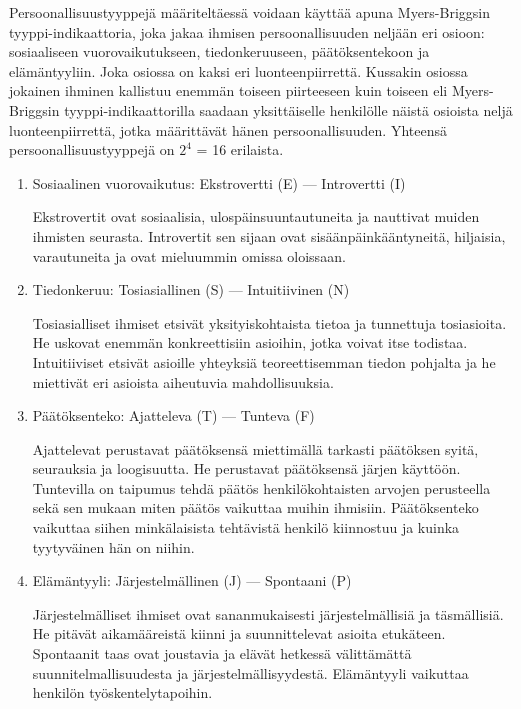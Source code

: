 \documentclass[finnish]{../tktltiki2}
\theoremstyle{definition}
\theoremstyle{remark}
\begin{document}
Persoonallisuustyyppejä määriteltäessä voidaan käyttää apuna
Myers-Briggsin tyyppi-indikaattoria, joka jakaa ihmisen persoonallisuuden neljään eri osioon: sosiaaliseen vuorovaikutukseen, tiedonkeruuseen, päätöksentekoon ja elämän\-tyyliin. Joka osiossa on
kaksi eri luonteenpiirrettä. Kussakin osiossa jokainen ihminen kallistuu enemmän toiseen piirteeseen kuin toiseen eli Myers-Briggsin
tyyppi-indikaattorilla saadaan yksittäiselle henkilölle näistä osioista neljä luonteenpiirrettä, jotka määrittävät hänen persoonallisuuden. Yhteensä
persoonallisuustyyppejä on $2^4$ = 16 erilaista.

\begin{enumerate}

\item Sosiaalinen vuorovaikutus: Ekstrovertti (E) --- Introvertti (I)

Ekstrovertit ovat sosiaalisia, ulospäinsuuntautuneita ja nauttivat
muiden ihmisten seurasta. Introvertit sen sijaan ovat sisäänpäinkääntyneitä, hiljaisia, varautuneita ja ovat mieluummin omissa oloissaan.

\item Tiedonkeruu: Tosiasiallinen (S) --- Intuitiivinen (N)

Tosiasialliset ihmiset etsivät yksityiskohtaista tietoa ja tunnettuja
tosiasioita. He uskovat enemmän konkreettisiin asioihin, jotka
voivat itse todistaa. Intuitiiviset etsivät asioille
yhteyksiä teoreettisemman tiedon pohjalta ja
he miettivät eri asioista aiheutuvia mahdollisuuksia.

\item Päätöksenteko: Ajatteleva (T) --- Tunteva (F)

Ajattelevat perustavat päätöksensä miettimällä tarkasti päätöksen syitä, seurauksia ja loogisuutta. He perustavat päätöksensä järjen käyttöön. Tuntevilla on taipumus tehdä päätös
henkilökohtaisten arvojen perusteella sekä sen mukaan miten päätös
vaikuttaa muihin ihmisiin. Päätöksenteko vaikuttaa siihen minkälaisista tehtävistä
henkilö kiinnostuu ja kuinka tyytyväinen hän on niihin.

\item Elämäntyyli: Järjestelmällinen (J) --- Spontaani (P)

Järjestelmälliset ihmiset ovat sananmukaisesti järjestelmällisiä
ja täsmäl\-lisiä. He pitävät aikamääreistä kiinni ja suunnittelevat
asioita etukäteen. Spontaanit taas ovat joustavia ja elävät
hetkessä välittämättä suunnitelmallisuudesta ja järjestelmällisyydestä.
Elämäntyyli vaikuttaa henkilön työskentelytapoihin.

\end{enumerate}
\end{document}
